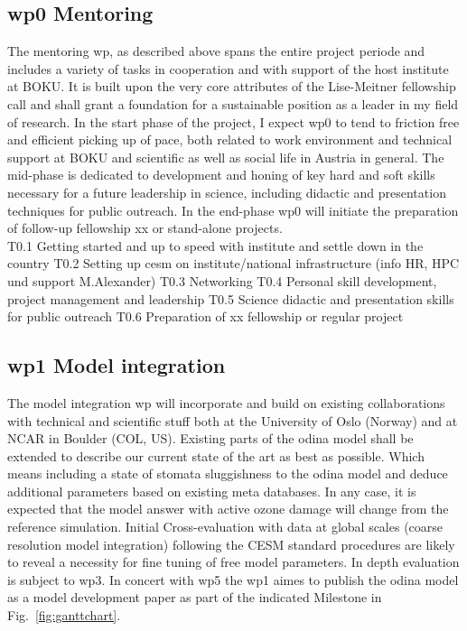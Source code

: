 \subsection*{\gls{wp}0 Mentoring}
\label{ssec:wp0}
The mentoring \gls{wp}, as described above spans the entire project periode and includes a variety of tasks in cooperation and with support of the host institute at BOKU. It is built upon the very core attributes of the Lise-Meitner fellowship call and shall grant a foundation for a sustainable position as a leader in my field of research. In the start phase of the project, I expect \gls{wp}0 to tend to friction free and efficient picking up of pace, both related to work environment and technical support at BOKU and scientific as well as social life in Austria in general. The mid-phase is dedicated to development and honing of key hard and soft skills necessary for a future leadership in science, including didactic and presentation techniques for public outreach. In the end-phase \gls{wp}0 will initiate the preparation of follow-up fellowship xx or stand-alone projects.\\

T0.1 Getting started and up to speed with institute and settle down in the country
T0.2 Setting up \gls{cesm} on institute/national infrastructure (info HR, HPC und support M.Alexander)
T0.3 Networking
T0.4 Personal skill development, project management and leadership
T0.5 Science didactic and presentation skills for public outreach
T0.6 Preparation of xx fellowship or regular project 

\subsection*{\gls{wp}1 Model integration}
\label{ssec:wp1}
The model integration \gls{wp} will incorporate and build on existing collaborations with technical and scientific stuff both at the University of Oslo (Norway) and at NCAR in Boulder (COL, US). Existing parts of the \gls{odina} model shall be extended to describe our current state of the art as best as possible. Which means including a state of stomata sluggishness to the \gls{odina} model and deduce additional parameters based on existing meta databases. In any case, it is expected that the model answer with active ozone damage will change from the reference simulation. Initial Cross-evaluation with data at global scales (coarse resolution model integration) following the CESM standard procedures are likely to reveal a necessity for fine tuning of free model parameters. In depth evaluation is subject to \gls{wp}3. In concert with \gls{wp}5 the \gls{wp}1 aimes to publish the \gls{odina} model as a model development paper as part of the indicated Milestone in Fig.~\ref{fig:ganttchart}.\\

